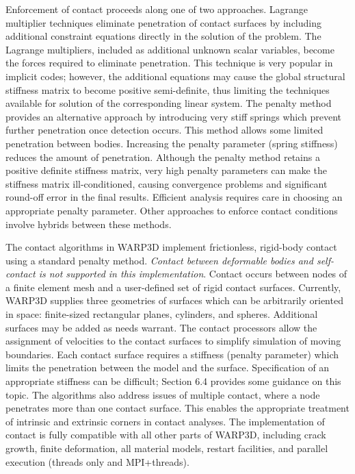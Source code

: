 \documentclass[11pt]{report}
\numberwithin{equation}{section}
\newcommand{\ti}{\emph}
\begin{document}
Enforcement of contact proceeds along one of two approaches. 
Lagrange multiplier techniques eliminate penetration of contact surfaces by including 
additional constraint equations directly in the solution of the problem. 
The Lagrange multipliers, included as additional unknown scalar variables, become the 
forces required to eliminate penetration. This technique is very popular in implicit codes; 
however, the additional equations may cause the global structural stiffness matrix to 
become positive semi-definite, thus limiting the techniques available for solution 
of the corresponding linear system. The penalty method provides an alternative 
approach by introducing very stiff springs which prevent further penetration once
detection occurs. This method allows some limited 
penetration between bodies. Increasing the penalty parameter (spring stiffness) 
reduces the amount of penetration. Although the penalty method retains a positive 
definite stiffness matrix, very high penalty parameters can make the stiffness matrix 
ill-conditioned, causing convergence problems and significant round-off error 
in the final results. Efficient analysis requires care in choosing an appropriate 
penalty parameter. Other approaches to enforce contact conditions involve hybrids 
between these methods.

The contact algorithms in WARP3D implement frictionless, rigid-body contact 
using a standard penalty method. \ti{Contact between deformable bodies and self-contact 
is not supported in this implementation}. Contact occurs between nodes of a finite 
element mesh and a user-defined set of rigid contact surfaces. Currently, WARP3D 
supplies three geometries of surfaces which can be arbitrarily oriented in space: 
finite-sized rectangular planes, cylinders, and spheres. Additional surfaces may be 
added as needs warrant. The contact processors allow the assignment of velocities 
to the contact surfaces to simplify simulation of moving boundaries. Each contact 
surface requires a stiffness (penalty parameter) which limits the penetration 
between the model and the surface. Specification of an appropriate stiffness can 
be difficult; Section 6.4 provides some guidance on this topic. The algorithms also 
address issues of multiple contact, where a node penetrates more than one contact 
surface. This enables the appropriate treatment of intrinsic and extrinsic corners 
in contact analyses. The implementation of contact is fully compatible with 
all other parts of WARP3D, including crack growth, finite deformation, all material 
models, restart facilities, and parallel execution (threads only and MPI+threads).
\end{document}
